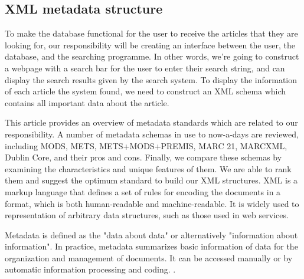 
\subsection{XML metadata structure}


To make the database functional for the user to receive the articles that they are looking for,
our responsibility will be creating an interface between the user, the database, and the searching programme. 
In other words, we're going to construct a webpage with a search bar for the user to enter their search string,
and can display the search results given by the search system. 
To display the information of each article the system found, we need to construct an XML schema which contains all important data about the article.

This article provides an overview of metadata standards which are related to our responsibility.
A number of metadata schemas in use to now-a-days are reviewed, including MODS, METS, METS+MODS+PREMIS, MARC 21, MARCXML, Dublin Core, and  their pros and cons. 
Finally, we compare these schemas by examining the characteristics and unique features of them. 
We are able to rank them and suggest the optimum standard to build our XML structures. 
XML is a markup language that defines a set of rules for encoding the documents in a format,  which is both human-readable and machine-readable. 
It is widely used to representation of arbitrary data structures, such as those used in web services.

Metadata is defined as the "data about data" or alternatively "information about information". 
In practice, metadata summarizes basic information of data for the organization and management of documents. 
It can be accessed manually or by automatic information processing and coding. \cite{underwood2003xml}.

